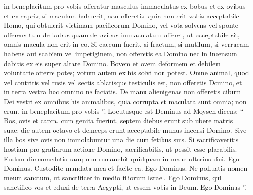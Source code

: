 \begin{biblechapter}
\begin{biblechapter}
\begin{biblechapter}
\begin{biblechapter}
\begin{biblechapter}
\begin{biblechapter}
\begin{biblechapter}
\begin{biblechapter}
\begin{biblechapter}
\begin{biblechapter}
\begin{biblechapter}
\begin{biblechapter}
\begin{biblechapter}
\begin{biblechapter}
\begin{biblechapter}
\begin{biblechapter}
\begin{biblechapter}
\begin{biblechapter}
\begin{biblechapter}
\begin{biblechapter}
\begin{biblechapter}
\begin{biblechapter}
\verse in beneplacitum pro vobis offeratur masculus immaculatus ex bobus et ex ovibus et ex capris; 
\verse si maculam habuerit, non offeretis, quia non erit vobis acceptabile.
 \verse Homo, qui obtulerit victimam pacificorum Domino, vel vota solvens vel sponte offerens tam de bobus quam de ovibus immaculatum offeret, ut acceptabile sit; omnis macula non erit in eo. 
\verse Si caecum fuerit, si fractum, si mutilum, si verrucam habens aut scabiem vel impetiginem, non offeretis ea Domino nec in incensum dabitis ex eis super altare Domino. 
\verse Bovem et ovem deformem et debilem voluntarie offerre potes; votum autem ex his solvi non potest. 
\verse Omne animal, quod vel contritis vel tusis vel sectis ablatisque testiculis est, non offeretis Domino, et in terra vestra hoc omnino ne faciatis. 
\verse De manu alienigenae non offeretis cibum Dei vestri ex omnibus his animalibus, quia corrupta et maculata sunt omnia; non erunt in beneplacitum pro vobis ”.
 \verse Locutusque est Dominus ad Moysen dicens: 
\verse “ Bos, ovis et capra, cum genita fuerint, septem diebus erunt sub ubere matris suae; die autem octavo et deinceps erunt acceptabile munus incensi Domino. 
\verse Sive illa bos sive ovis non immolabuntur una die cum fetibus suis.
 \verse Si sacrificaveritis hostiam pro gratiarum actione Domino, sacrificabitis, ut possit esse placabilis. 
\verse Eodem die comedetis eam; non remanebit quidquam in mane alterius diei. Ego Dominus.
 \verse Custodite mandata mea et facite ea. Ego Dominus. 
\verse Ne polluatis nomen meum sanctum, ut sanctificer in medio filiorum Israel. Ego Dominus, qui sanctifico vos 
\verse et eduxi de terra Aegypti, ut essem vobis in Deum. Ego Dominus ”.
 

\end{biblechapter}
\end{biblechapter}
\end{biblechapter}
\end{biblechapter}
\end{biblechapter}
\end{biblechapter}
\end{biblechapter}
\end{biblechapter}
\end{biblechapter}
\end{biblechapter}
\end{biblechapter}
\end{biblechapter}
\end{biblechapter}
\end{biblechapter}
\end{biblechapter}
\end{biblechapter}
\end{biblechapter}
\end{biblechapter}
\end{biblechapter}
\end{biblechapter}
\end{biblechapter}
\end{biblechapter}
